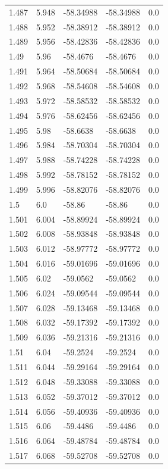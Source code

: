 \begin{tabular}{lllll}
1.487 & 5.948 & -58.34988 & -58.34988 & 0.0 \\
1.488 & 5.952 & -58.38912 & -58.38912 & 0.0 \\
1.489 & 5.956 & -58.42836 & -58.42836 & 0.0 \\
1.49 & 5.96 & -58.4676 & -58.4676 & 0.0 \\
1.491 & 5.964 & -58.50684 & -58.50684 & 0.0 \\
1.492 & 5.968 & -58.54608 & -58.54608 & 0.0 \\
1.493 & 5.972 & -58.58532 & -58.58532 & 0.0 \\
1.494 & 5.976 & -58.62456 & -58.62456 & 0.0 \\
1.495 & 5.98 & -58.6638 & -58.6638 & 0.0 \\
1.496 & 5.984 & -58.70304 & -58.70304 & 0.0 \\
1.497 & 5.988 & -58.74228 & -58.74228 & 0.0 \\
1.498 & 5.992 & -58.78152 & -58.78152 & 0.0 \\
1.499 & 5.996 & -58.82076 & -58.82076 & 0.0 \\
1.5 & 6.0 & -58.86 & -58.86 & 0.0 \\
1.501 & 6.004 & -58.89924 & -58.89924 & 0.0 \\
1.502 & 6.008 & -58.93848 & -58.93848 & 0.0 \\
1.503 & 6.012 & -58.97772 & -58.97772 & 0.0 \\
1.504 & 6.016 & -59.01696 & -59.01696 & 0.0 \\
1.505 & 6.02 & -59.0562 & -59.0562 & 0.0 \\
1.506 & 6.024 & -59.09544 & -59.09544 & 0.0 \\
1.507 & 6.028 & -59.13468 & -59.13468 & 0.0 \\
1.508 & 6.032 & -59.17392 & -59.17392 & 0.0 \\
1.509 & 6.036 & -59.21316 & -59.21316 & 0.0 \\
1.51 & 6.04 & -59.2524 & -59.2524 & 0.0 \\
1.511 & 6.044 & -59.29164 & -59.29164 & 0.0 \\
1.512 & 6.048 & -59.33088 & -59.33088 & 0.0 \\
1.513 & 6.052 & -59.37012 & -59.37012 & 0.0 \\
1.514 & 6.056 & -59.40936 & -59.40936 & 0.0 \\
1.515 & 6.06 & -59.4486 & -59.4486 & 0.0 \\
1.516 & 6.064 & -59.48784 & -59.48784 & 0.0 \\
1.517 & 6.068 & -59.52708 & -59.52708 & 0.0 \\

\end{tabular}
